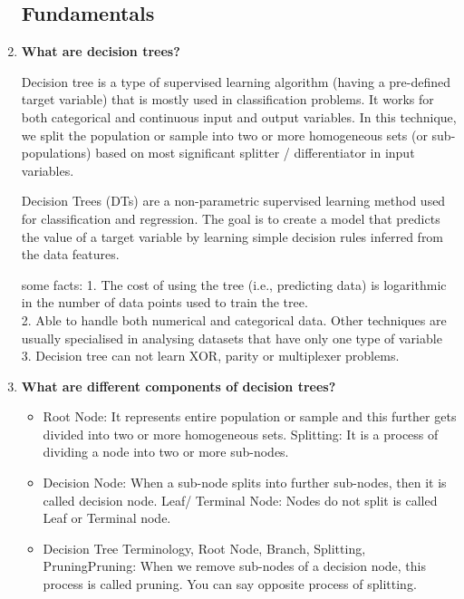 



\begin{enumerate}

\subsection{ Fundamentals}

\item{\textbf{\color{blue} What are decision trees?}}


Decision tree is a type of supervised learning algorithm (having a pre-defined target variable) that is mostly used in classification problems. It works for both categorical and continuous input and output variables. In this technique, we split the population or sample into two or more homogeneous sets (or sub-populations) based on most significant splitter / differentiator in input variables. 

Decision Trees (DTs) are a non-parametric supervised learning method used for classification and regression. The goal is to create a model that predicts the value of a target variable by learning simple decision rules inferred from the data features.

some facts:
1. The cost of using the tree (i.e., predicting data) is logarithmic in the number of data points used to train the tree.\\
2. Able to handle both numerical and categorical data. Other techniques are usually specialised in analysing datasets that have only one type of variable\\
3. Decision tree can not learn XOR, parity or multiplexer problems.



\item{\textbf{\color{blue} What are different components of decision trees?}}
\begin{itemize}
\item Root Node: It represents entire population or sample and this further gets divided into two or more homogeneous sets.
Splitting: It is a process of dividing a node into two or more sub-nodes.

\item Decision Node: When a sub-node splits into further sub-nodes, then it is called decision node.
Leaf/ Terminal Node: Nodes do not split is called Leaf or Terminal node.

\item Decision Tree Terminology, Root Node, Branch, Splitting, PruningPruning: When we remove sub-nodes of a decision node, this process is called pruning. You can say opposite process of splitting.


\end{itemize}
\end{enumerate}
